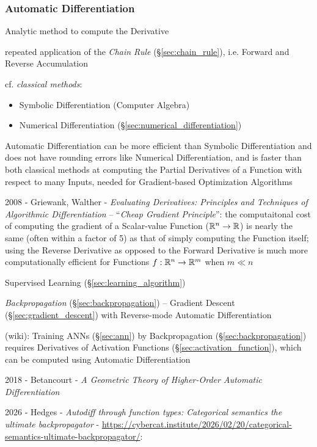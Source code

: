 \subsubsection{Automatic Differentiation}\label{sec:automatic_differentiation}

Analytic method to compute the Derivative

repeated application of the \emph{Chain Rule} (\S\ref{sec:chain_rule}), i.e.
Forward and Reverse Accumulation

cf. \emph{classical methods}:

\begin{itemize}
  \item Symbolic Differentiation (Computer Algebra)
  \item Numerical Differentiation (\S\ref{sec:numerical_differentiation})
\end{itemize}

Automatic Differentiation can be more efficient than Symbolic Differentiation
and does not have rounding errors like Numerical Differentiation, and is faster
than both classical methods at computing the Partial Derivatives of a Function
with respect to many Inputs, needed for Gradient-based Optimization Algorithms

2008 - Griewank, Walther - \emph{Evaluating Derivatives: Principles and
Techniques of Algorithmic Differentiation} -- ``\emph{Cheap Gradient
Principle}'': the computaitonal cost of computing the gradient of a Scalar-value
Function ($\mathbb{R}^n \to \mathbb{R}$) is nearly the same (often within a factor of 5)
as that of simply computing the Function itself; using the Reverse Derivative as
opposed to the Forward Derivative is much more computationally efficient for
Functions $f : \mathbb{R}^n \to \mathbb{R}^m$ when $m \ll n$

Supervised Learning (\S\ref{sec:learning_algorithm})

\emph{Backpropagation} (\S\ref{sec:backpropagation}) -- Gradient Descent
(\S\ref{sec:gradient_descent}) with Reverse-mode Automatic Differentiation

(wiki): Training ANNs (\S\ref{sec:ann}) by Backpropagation
(\S\ref{sec:backpropagation}) requires Derivatives of Activation Functions
(\S\ref{sec:activation_function}), which can be computed using Automatic
Differentiation

2018 - Betancourt -
\emph{A Geometric Theory of Higher-Order Automatic Differentiation}

2026 - Hedges - \emph{Autodiff through function types: Categorical semantics the
ultimate backpropagator} -
\url{https://cybercat.institute/2026/02/20/categorical-semantics-ultimate-backpropagator/}:

